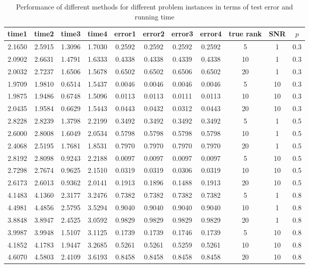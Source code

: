 \documentclass{article}
\begin{document}
\begin{table}[!htp]
\centering
\caption{Performance of different methods for different problem instances in terms of test error and running time}
\vspace{0.5em}
\begin{tabular}{|c|c|c|c|c|c|c|c|c|c|c|}
\hline
time1&time2&time3&time4&error1&error2&error3&error4&true rank&SNR&$p$\\
\hline
2.1650&2.5915&1.3096&1.7030&0.2592&0.2592&0.2592&0.2592&5&1&0.3\\
\hline
2.0902&2.6631&1.4791&1.6333&0.4338&0.4338&0.4339&0.4338&10&1&0.3\\
\hline
2.0032&2.7237&1.6506&1.5678&0.6502&0.6502&0.6506&0.6502&20&1&0.3\\
\hline
1.9709&1.9810&0.6514&1.5437&0.0046&0.0046&0.0046&0.0046&5&10&0.3\\
\hline
1.9875&1.9486&0.6748&1.5096&0.0113&0.0113&0.0111&0.0113&10&10&0.3\\
\hline
2.0435&1.9584&0.6629&1.5443&0.0443&0.0432&0.0312&0.0443&20&10&0.3\\
\hline
2.8228&2.8239&1.3798&2.2199&0.3492&0.3492&0.3492&0.3492&5&1&0.5\\
\hline
2.6000&2.8008&1.6049&2.0534&0.5798&0.5798&0.5798&0.5798&10&1&0.5\\
\hline
2.4068&2.5195&1.7681&1.8531&0.7970&0.7970&0.7970&0.7970&20&1&0.5\\
\hline
2.8192&2.8098&0.9243&2.2188&0.0097&0.0097&0.0097&0.0097&5&10&0.5\\
\hline
2.7298&2.7674&0.9625&2.1510&0.0319&0.0319&0.0306&0.0319&10&10&0.5\\
\hline
2.6173&2.6013&0.9362&2.0141&0.1913&0.1896&0.1488&0.1913&20&10&0.5\\
\hline
4.1483&4.1360&2.3177&3.2476&0.7382&0.7382&0.7382&0.7382&5&1&0.8\\
\hline
4.4981&4.4856&2.5795&3.5294&0.9040&0.9040&0.9040&0.9040&10&1&0.8\\
\hline
3.8848&3.8947&2.4525&3.0592&0.9829&0.9829&0.9829&0.9829&20&1&0.8\\
\hline
3.9987&3.9948&1.5107&3.1125&0.1739&0.1739&0.1746&0.1739&5&10&0.8\\
\hline
4.1852&4.1783&1.9447&3.2685&0.5261&0.5261&0.5259&0.5261&10&10&0.8\\
\hline
4.6070&4.5803&2.4109&3.6193&0.8458&0.8458&0.8458&0.8458&20&10&0.8\\
\hline
\end{tabular}
\end{table}
\end{document}

